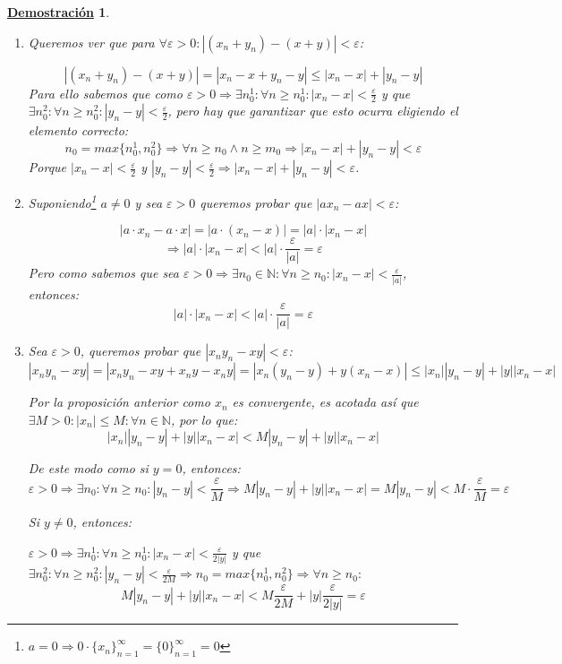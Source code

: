 \documentclass[10pt,a4paper,openright]{book}
\theoremstyle{break}
\newtheorem*{demo}{\underline{Demostración}}
\begin{document}
\begin{demo}
\begin{enumerate}
\item Queremos ver que para $\forall \varepsilon>0: |(x_n+y_n)-(x+y)|<\varepsilon$:

$$|(x_n+y_n)-(x+y)|=|x_n-x+y_n-y|\leq |x_n-x|+|y_n-y|$$
Para ello sabemos que como $\varepsilon>0\Rightarrow\exists n_0^1: \forall n\geq n_0^1: |x_n-x|<\frac{\varepsilon}{2}$ y que $\exists n_0^2: \forall n \geq n_0^2: |y_n-y|<\frac{\varepsilon}{2}$, pero hay que garantizar que esto ocurra eligiendo el elemento correcto:
$$n_0=max\{n_0^1, n_0^2\}\Rightarrow \forall n\geq n_0\wedge n\geq m_0\Rightarrow |x_n-x|+|y_n-y|<\varepsilon$$
Porque $|x_n-x|<\frac{\varepsilon}{2}$ y $|y_n-y|<\frac{\varepsilon}{2}\Rightarrow |x_n-x|+|y_n-y|<\varepsilon$.
\vspace{0.35cm}

\item Suponiendo\footnote{$a=0\Rightarrow 0\cdot \{x_n\}_{n=1}^\infty=\{0\}_{n=1}^\infty=0$} $a\neq 0$ y sea $\varepsilon>0$ queremos probar que $|ax_n-ax|<\varepsilon$:

$$|a\cdot x_n-a\cdot x|=|a\cdot (x_n-x)|=|a|\cdot |x_n-x|$$
$$\Rightarrow |a|\cdot |x_n-x| < |a|\cdot \frac{\varepsilon}{|a|}=\varepsilon$$
Pero como sabemos que sea $\varepsilon>0\Rightarrow \exists n_0\in \mathbb N: \forall n\geq n_0: |x_n-x|<\frac{\varepsilon}{|a|}$, entonces:
$$|a|\cdot |x_n-x| < |a|\cdot \frac{\varepsilon}{|a|}=\varepsilon$$

\item Sea $\varepsilon>0$, queremos probar que $|x_ny_n-xy|<\varepsilon$:
$$|x_ny_n-xy|=|x_ny_n-xy+x_ny-x_ny|=|x_n(y_n-y)+y(x_n-x)|\leq |x_n||y_n-y|+|y||x_n-x|$$

Por la proposición anterior como $x_n$ es convergente, es acotada así que $\exists M>0: |x_n|\leq M: \forall n\in \mathbb N$, por lo que:
$$|x_n||y_n-y|+|y||x_n-x|< M|y_n-y|+|y||x_n-x|$$

De este modo como si $y=0$, entonces:
$$\varepsilon>0\Rightarrow\exists n_0: \forall n\geq n_0: |y_n-y|<\frac{\varepsilon}{M}\Rightarrow M|y_n-y|+|y||x_n-x|=M|y_n-y|<M\cdot \frac{\varepsilon}{M}=\varepsilon$$

Si $y\neq 0$, entonces:\par
$\varepsilon>0\Rightarrow\exists n_0^1: \forall n\geq n_0^1: |x_n-x|<\frac{\varepsilon}{2|y|}$ y que $\exists n_0^2: \forall n \geq n_0^2: |y_n-y|<\frac{\varepsilon}{2M}\Rightarrow n_0=max\{n_0^1, n_0^2\}\Rightarrow \forall n\geq n_0:$
$$M|y_n-y|+|y||x_n-x|< M\frac{\varepsilon}{2M}+|y|\frac{\varepsilon}{2|y|}=\varepsilon$$


\end{enumerate}
\end{demo}
\end{document}
